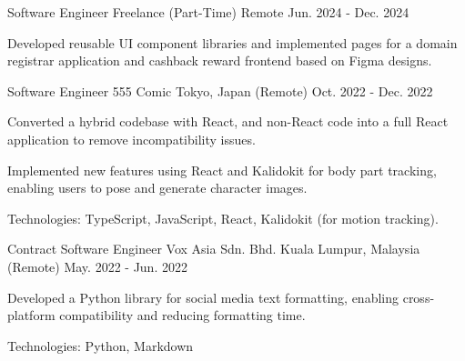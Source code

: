 

\begin{cventries}


  \cventry
    {Software Engineer} %
    {Freelance (Part-Time)} %
    {Remote} %
    {Jun. 2024 - Dec. 2024} %
    {
      \begin{cvitems} %
        \item {Developed reusable UI component libraries and implemented pages for a domain registrar application and cashback reward frontend based on Figma designs.}
      \end{cvitems}
    }

  \cventry
    {Software Engineer} %
    {555 Comic} %
    {Tokyo, Japan (Remote)} %
    {Oct. 2022 - Dec. 2022} %
    {
      \begin{cvitems} %
        \item {Converted a hybrid codebase with React, and non-React code into a full React application to remove incompatibility issues.}
        \item {Implemented new features using React and Kalidokit for body part tracking, enabling users to pose and generate character images.}
        \item {Technologies: TypeScript, JavaScript, React, Kalidokit (for motion tracking).}
      \end{cvitems}
    }

  \cventry
    {Contract Software Engineer} %
    {Vox Asia Sdn. Bhd.} %
    {Kuala Lumpur, Malaysia (Remote)} %
    {May. 2022 - Jun. 2022} %
    {
      \begin{cvitems} %
        \item {Developed a Python library for social media text formatting, enabling cross-platform compatibility and reducing formatting time.}
        \item {Technologies: Python, Markdown}
      \end{cvitems}
    }


\end{cventries}
